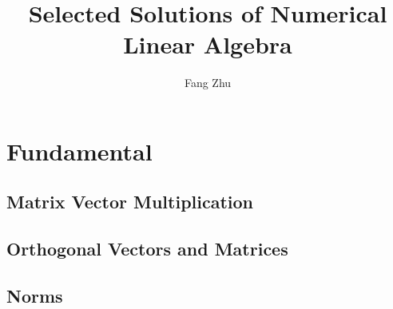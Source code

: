 \documentclass{book}
\title{Selected Solutions of Numerical Linear Algebra}
\author{Fang Zhu}
\begin{document}
\maketitle
\tableofcontents


\part{Fundamental}

\chapter{Matrix Vector Multiplication}



\chapter{Orthogonal Vectors and Matrices}


\chapter{Norms}

\end{document}
